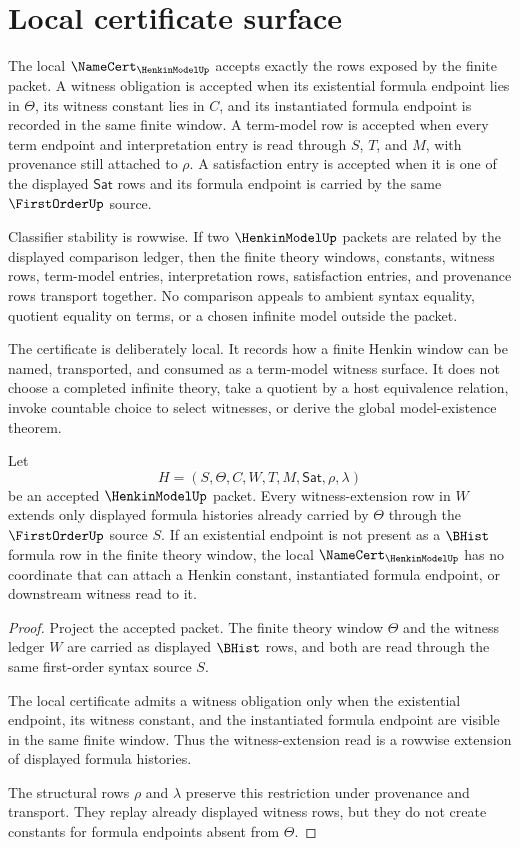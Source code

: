 \section{Local certificate surface}
\label{sec:henkin-model-local-certificate}

The local $\NameCert_{\HenkinModelUp}$ accepts exactly the rows exposed by the
finite packet. A witness obligation is accepted when its existential formula
endpoint lies in $\Theta$, its witness constant lies in $C$, and its
instantiated formula endpoint is recorded in the same finite window. A
term-model row is accepted when every term endpoint and interpretation entry
is read through $S$, $T$, and $M$, with provenance still attached to $\rho$.
A satisfaction entry is accepted when it is one of the displayed
$\mathsf{Sat}$ rows and its formula endpoint is carried by the same
$\FirstOrderUp$ source.

Classifier stability is rowwise. If two $\HenkinModelUp$ packets are related
by the displayed comparison ledger, then the finite theory windows,
constants, witness rows, term-model entries, interpretation rows, satisfaction
entries, and provenance rows transport together. No comparison appeals to
ambient syntax equality, quotient equality on terms, or a chosen infinite
model outside the packet.

The certificate is deliberately local. It records how a finite Henkin window
can be named, transported, and consumed as a term-model witness surface. It
does not choose a completed infinite theory, take a quotient by a host
equivalence relation, invoke countable choice to select witnesses, or derive
the global model-existence theorem.

\begin{theorem}
\label{thm:henkin-model-witness-extension-obligations}
Let
$$
H=(S,\Theta,C,W,T,M,\mathsf{Sat},\rho,\lambda)
$$
be an accepted $\HenkinModelUp$ packet. Every witness-extension row in $W$ extends only displayed formula histories already carried by $\Theta$ through the $\FirstOrderUp$ source $S$. If an existential endpoint is not present as a $\BHist$ formula row in the finite theory window, the local $\NameCert_{\HenkinModelUp}$ has no coordinate that can attach a Henkin constant, instantiated formula endpoint, or downstream witness read to it.
\end{theorem}
\begin{proof}
Project the accepted packet. The finite theory window $\Theta$ and the witness ledger $W$ are carried as displayed $\BHist$ rows, and both are read through the same first-order syntax source $S$.

The local certificate admits a witness obligation only when the existential endpoint, its witness constant, and the instantiated formula endpoint are visible in the same finite window. Thus the witness-extension read is a rowwise extension of displayed formula histories.

The structural rows $\rho$ and $\lambda$ preserve this restriction under provenance and transport. They replay already displayed witness rows, but they do not create constants for formula endpoints absent from $\Theta$.
\end{proof}

